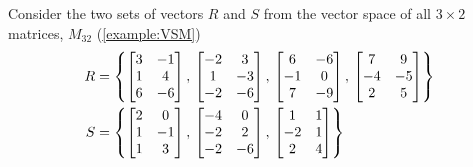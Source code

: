 \documentclass{ximera}
\begin{document}
\begin{example}

  Consider the two sets of vectors $R$ and $S$ from the vector space of all $3\times 2$ matrices, $M_{32}$ (\ref{example:VSM})
  \begin{align*}
    R&=\left\{
       \begin{bmatrix}
         3 & -1\\1 & 4\\6 & -6
       \end{bmatrix},\,
                            \begin{bmatrix}
                              -2 & 3\\1 & -3\\-2 & -6
                            \end{bmatrix},\,
                                                   \begin{bmatrix}
                                                     6 & -6\\-1 & 0\\7 & -9
                                                   \end{bmatrix},\,
                                                                         \begin{bmatrix}
                                                                           7 & 9\\-4 & -5\\2 & 5
                                                                         \end{bmatrix}
                                                                                               \right\}\\
    S&=\left\{
       \begin{bmatrix}
         2 & 0\\ 1 & -1\\ 1 & 3
       \end{bmatrix},\,
                              \begin{bmatrix}
                                -4 & 0\\ -2 & 2\\ -2 & -6
                              \end{bmatrix},\,
                                                       \begin{bmatrix}
                                                         1 & 1\\ -2 & 1\\ 2 & 4

\end{bmatrix}\right\}
\end{align*}
\end{example}
\end{document}
